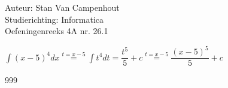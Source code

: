 \documentclass[a4paper]{article}
\begin{document}
  
\noindent \large Auteur: Stan Van Campenhout \\
\noindent \large Studierichting:  Informatica\\
\noindent \large Oefeningenreeks 4A nr. 26.1\\

\medskip

\normalsize

$ \displaystyle\int\left(x-5\right)^4dx \stackrel{t = x-5}{=} \displaystyle\int t^4dt = \dfrac{t^5}{5} + c \stackrel{t = x-5}{=} \dfrac{\left(x-5\right)^5}{5} + c $\\
\begin{thebibliography}{999}
\end{thebibliography}
\end{document}
